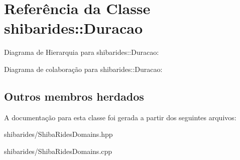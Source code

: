 \hypertarget{classshibarides_1_1Duracao}{}\section{Referência da Classe shibarides\+:\+:Duracao}
\label{classshibarides_1_1Duracao}


Diagrama de Hierarquia para shibarides\+:\+:Duracao\+:


Diagrama de colaboração para shibarides\+:\+:Duracao\+:
\subsection*{Outros membros herdados}


A documentação para esta classe foi gerada a partir dos seguintes arquivos\+:\begin{DoxyCompactItemize}
\item 
shibarides/Shiba\+Rides\+Domains.\+hpp\item 
shibarides/Shiba\+Rides\+Domains.\+cpp\end{DoxyCompactItemize}
